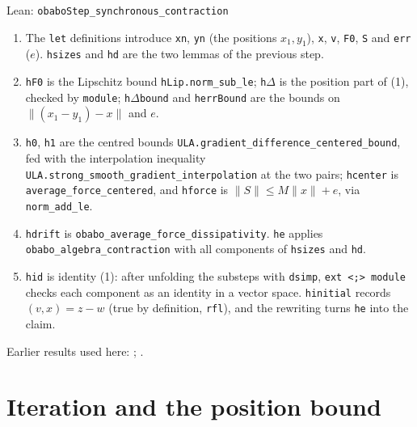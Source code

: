 \documentclass[11pt,a4paper]{article}
\begin{document}
\begin{leanbox}{Lean: \texttt{obaboStep\_\allowbreak{}synchronous\_\allowbreak{}contraction}}
\begin{enumerate}


\item The \texttt{let} definitions introduce \texttt{xn}, \texttt{yn} (the positions \(x_1,y_1\)), \texttt{x}, \texttt{v}, \texttt{F0}, \texttt{S} and \texttt{err} (\(e\)). \texttt{hsizes} and \texttt{hd} are the two lemmas of the previous step.

\item \texttt{h\allowbreak{}F0} is the Lipschitz bound \texttt{h\allowbreak{}Lip.\allowbreak{}norm\_\allowbreak{}sub\_\allowbreak{}le}; \texttt{h\allowbreak{}\ensuremath{\Delta}} is the position part of (1), checked by \texttt{module}; \texttt{h\allowbreak{}\ensuremath{\Delta}bound} and \texttt{herr\allowbreak{}Bound} are the bounds on \(\|(x_1-y_1)-x\|\) and \(e\).

\item \texttt{h0}, \texttt{h1} are the centred bounds \texttt{ULA.\allowbreak{}gradient\_\allowbreak{}difference\_\allowbreak{}centered\_\allowbreak{}bound}, fed with the interpolation inequality \texttt{ULA.\allowbreak{}strong\_\allowbreak{}smooth\_\allowbreak{}gradient\_\allowbreak{}interpolation} at the two pairs; \texttt{hcenter} is \texttt{average\_\allowbreak{}force\_\allowbreak{}centered}, and \texttt{hforce} is \(\|S\|\le M\|x\|+e\), via \texttt{norm\_\allowbreak{}add\_\allowbreak{}le}.

\item \texttt{hdrift} is \texttt{obabo\_\allowbreak{}average\_\allowbreak{}force\_\allowbreak{}dissipativity}. \texttt{he} applies \texttt{obabo\_\allowbreak{}algebra\_\allowbreak{}contraction} with all components of \texttt{hsizes} and \texttt{hd}.

\item \texttt{hid} is identity (1): after unfolding the substeps with \texttt{dsimp}, \texttt{ext <;> module} checks each component as an identity in a vector space. \texttt{hinitial} records \((v,x)=z-w\) (true by definition, \texttt{rfl}), and the rewriting turns \texttt{he} into the claim.

\end{enumerate}
\end{leanbox}


Earlier results used here: \cite[Section~3.10.2]{LangevinLean2026ULASC}; \cite[Section~3.10.3]{LangevinLean2026ULASC}.

\section{\texorpdfstring{Iteration and the position bound}{Iteration and the position bound}}
\end{document}
